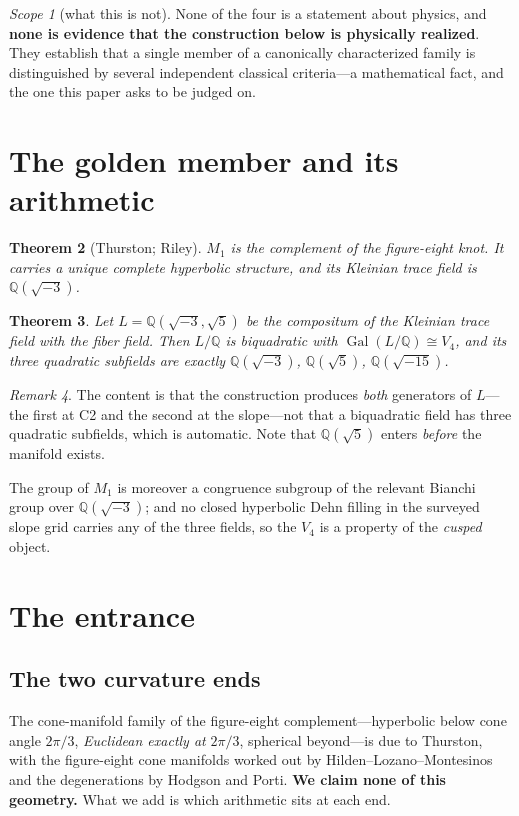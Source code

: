 \documentclass[11pt,reqno]{amsart}
\theoremstyle{plain}
\newtheorem{theorem}{Theorem}[section]
\theoremstyle{definition}
\theoremstyle{remark}
\newtheorem{scope}[theorem]{Scope}
\newtheorem{remark}[theorem]{Remark}
\newcommand{\Q}{\mathbb{Q}}
\newcommand{\Gal}{\operatorname{Gal}}
\begin{document}
\begin{scope}[what this is not]
None of the four is a statement about physics, and \textbf{none is evidence that the
construction below is physically realized}. They establish that a single member of a
canonically characterized family is distinguished by several independent classical
criteria---a mathematical fact, and the one this paper asks to be judged on.
\end{scope}

\section{The golden member and its arithmetic}\label{sec:arith}

\begin{theorem}[Thurston; Riley]\label{thm:thurston}
$M_1$ is the complement of the figure-eight knot. It carries a unique complete
hyperbolic structure, and its Kleinian trace field is $\Q(\sqrt{-3})$.
\end{theorem}

\begin{theorem}\label{thm:v4}
Let $L=\Q(\sqrt{-3},\sqrt5)$ be the compositum of the Kleinian trace field with the
fiber field. Then $L/\Q$ is biquadratic with $\Gal(L/\Q)\cong V_4$, and its three
quadratic subfields are exactly $\Q(\sqrt{-3})$, $\Q(\sqrt5)$, $\Q(\sqrt{-15})$.
\end{theorem}

\begin{remark}
The content is that the construction produces \emph{both} generators of $L$---the first
at C2 and the second at the slope---not that a biquadratic field has three quadratic
subfields, which is automatic. Note that $\Q(\sqrt5)$ enters \emph{before} the manifold
exists.
\end{remark}

The group of $M_1$ is moreover a congruence subgroup of the relevant Bianchi group over
$\Q(\sqrt{-3})$; and no closed hyperbolic Dehn filling in the surveyed slope grid
carries any of the three fields, so the $V_4$ is a property of the \emph{cusped} object.

\section{The entrance}\label{sec:entrance}

\subsection{The two curvature ends}
The cone-manifold family of the figure-eight complement---hyperbolic below cone angle
$2\pi/3$, \emph{Euclidean exactly at} $2\pi/3$, spherical beyond---is due to Thurston,
with the figure-eight cone manifolds worked out by
Hilden--Lozano--Montesinos~\cite{HLM95} and the degenerations by Hodgson and Porti.
\textbf{We claim none of this geometry.} What we add is which arithmetic sits at each
end.
\end{document}
